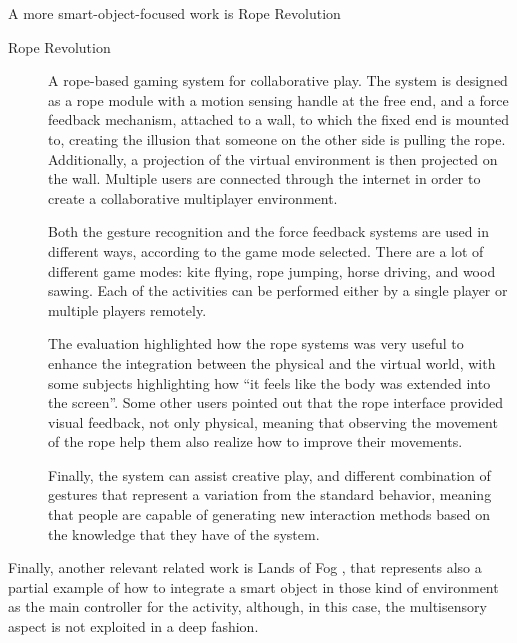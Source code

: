 \noindent A more smart-object-focused work is Rope Revolution \cite{yao_rope_2011}

\begin{description}
	\item[Rope Revolution]  A rope-based gaming system for collaborative play.
	The system is designed as a rope module with a motion sensing handle at the free end, and a force feedback mechanism, attached to a wall, to which the fixed end is mounted to, creating the illusion that someone on the other side is pulling the rope.
	Additionally, a projection of the virtual environment is then projected on the wall. Multiple users are connected through the internet in order to create a collaborative multiplayer environment.
	
	Both the gesture recognition and the force feedback systems are used in different ways, according to the game mode selected.
	There are a lot of different game modes: kite flying, rope jumping, horse driving, and wood sawing. Each of the activities can be performed either by a single player or multiple players remotely.
	
	The evaluation highlighted how the rope systems was very useful to enhance the integration between the physical and the virtual world, with some subjects highlighting how ``it feels like the body was extended into the screen''.
	Some other users pointed out that the rope interface provided visual feedback, not only physical, meaning that observing the movement of the rope help them also realize how to improve their movements.
	
	Finally, the system can assist creative play, and different combination of gestures that represent a variation from the standard behavior,  meaning that people are capable of generating new interaction methods based on the knowledge that they have of the system.
\end{description}

\noindent Finally, another relevant related work is Lands of Fog \cite{mora-guiard_lands_2016}, that represents also a partial example of how to integrate a smart object in those kind of environment as the main controller for the activity, although, in this case, the multisensory aspect is not exploited in a deep fashion.


